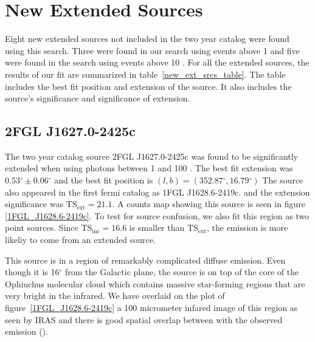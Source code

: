 \documentclass[12pt,preprint]{aastex}
\newcommand{\gev}{\text{GeV}\xspace}
\newcommand{\tsext}{{\ensuremath{\text{TS}_\text{ext}}}\xspace}
\newcommand{\tsinc}{\ensuremath{\text{TS}_\text{inc}}\xspace}
\renewcommand{\deg}{\ensuremath{^\circ}\xspace}
\begin{document}
\section{New Extended Sources}
\label{new_ext_srcs_section}


Eight new extended sources not included in the two year catalog were
found using this search. Three were found in our search using events
above 1 \gev and five were found in the search using events
above 10 \gev.
For all the extended sources, the results of our fit are summarized in
table~\ref{new_ext_srcs_table}. The table includes the best fit position and
extension of the source. It also includes the source's significance and
significance of extension.


\subsection{2FGL J1627.0-2425c}
\label{section_ophiuchus}


The two year catalog source 2FGL J1627.0-2425c was found to be
significantly extended when using photons between 1 \gev and 100 \gev.
The best fit extension was $0.53\deg\pm0.06\deg$ and the best fit position
is $(l,b)=(352.87\deg, 16.79\deg)$ The source also appeared in the first
fermi catalog as 1FGL J1628.6-2419c.  and the extension significance
was $\tsext=21.1$.  A counts map showing this source is seen in
figure \ref{1FGL_J1628.6-2419c}.  To test for source confusion, we also
fit this region as two point sources. Since $\tsinc=16.6$ is smaller
than \tsext, the emission is more likeliy to come from an extended source.

This source is in a region of remarkably complicated diffuse emission.
Even though it is 16\deg from the Galactic plane, the source is on top
of the core of the Ophiuchus molecular cloud which contains massive
star-forming regions that are very bright in the infrared.  We have
overlaid on the plot of figure~\ref{1FGL_J1628.6-2419c} a 100 micrometer
infared image of this region as seen by IRAS and there is good spatial
overlap between with the \gev observed emission
(\cite{iras_rho_ophiuci}).
\end{document}
